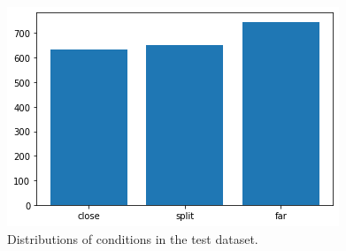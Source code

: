 \begin{figure}[ht]
\centering
\includegraphics[width=\columnwidth]{assets/testset_conditions.png}
\caption[Test dataset words]
{Distributions of conditions in the test dataset.}
\label{figure:testset-conditions}
\end{figure}
